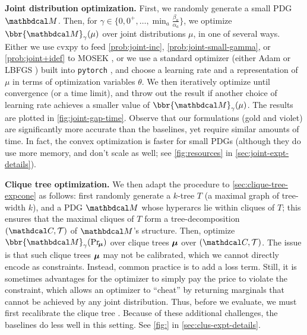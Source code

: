 \textbf{Joint distribution optimization.} 
First, we randomly generate a small PDG $\dg M$.
Then, for 
$\gamma \in \{0, 0^+, 
     \ldots, \min_a \frac{\beta_a}{\alpha_a} \}$,
we optimize $\bbr{\dg M}_\gamma(\mu)$ over joint distributions $\mu$, 
in one of several ways. 
Either we use cvxpy \parencite{diamond2016cvxpy}
to feed  
\eqref{prob:joint-inc}, \eqref{prob:joint-small-gamma}, or \eqref{prob:joint+idef} 
    to MOSEK \cite{mosek}, 
or we use a standard optimizer (either Adam \parencite{kingma2014adam} or LBFGS \parencite{fletcher2013practical}) built into \texttt{pytorch} \parencite{pytorch}, and choose a learning rate
and a representation of $\mu$ in terms of optimization variables $\theta$. 
We then iteratively optimize until convergence (or a time limit), and throw out the result if another choice of learning rate achieves a smaller value of $\bbr{\dg M}_\gamma(\mu)$.
The results are plotted in \cref{fig:joint-gap-time}.
Observe that our formulations (gold and violet) are significantly more accurate than the baselines, yet require similar amounts of time. In fact, the convex optimization is faster for small PDGs 
(although they do use more memory, and don't scale as well; see \cref{fig:resources} in \cref{sec:joint-expt-details}).

\textbf{Clique tree optimization.} 
We then adapt the procedure to \cref{sec:clique-tree-expcone} as follows:
first randomly generate a $k$-tree $T$ (a maximal graph of tree-width $k$),
and a PDG $\dg M$ whose hyperarcs lie within cliques of $T$; 
this ensures that the maximal cliques of $T$ form a tree-decomposition $(\C, \mathcal T)$ of $\dg M$'s structure.
Then, optimize $\bbr{\dg M}_\gamma(\Pr_{\!\bmu})$ over clique trees $\boldsymbol\mu$
over $(\C, \mathcal T)$. 
The issue is that such clique trees $\boldsymbol\mu$ may not be calibrated, which
we cannot directly encode as constraints. Instead, common practice is to add a loss term. 
Still, it is sometimes advantages for the optimizer to simply pay the price to violate the constraint, which allows an optimizer to ``cheat'' by returning marginals that cannot be achieved by any joint distribution. 
Thus, before we evaluate, we must first recalibrate the clique tree \parencite[\S10]{koller2009probabilistic}.
Because of these additional challenges, the baselines do less well in this setting.
See \cref{fig:} in \cref{sec:clus-expt-details}.

